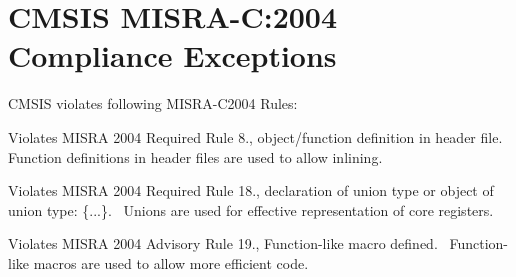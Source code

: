 \hypertarget{group___c_m_s_i_s___m_i_s_r_a___exceptions}{}\section{C\+M\+S\+IS M\+I\+S\+R\+A-\/C\+:2004 Compliance Exceptions}
\label{group___c_m_s_i_s___m_i_s_r_a___exceptions}
C\+M\+S\+IS violates following M\+I\+S\+R\+A-\/\+C2004 Rules\+:


\begin{DoxyItemize}
\item Violates M\+I\+S\+RA 2004 Required Rule 8., object/function definition in header file.~\newline
 Function definitions in header files are used to allow \textquotesingle{}inlining\textquotesingle{}.
\item Violates M\+I\+S\+RA 2004 Required Rule 18., declaration of union type or object of union type\+: \textquotesingle{}\{...\}\textquotesingle{}.~\newline
 Unions are used for effective representation of core registers.
\item Violates M\+I\+S\+RA 2004 Advisory Rule 19., Function-\/like macro defined.~\newline
 Function-\/like macros are used to allow more efficient code. 
\end{DoxyItemize}